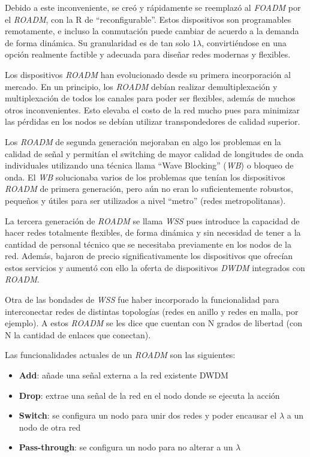Debido a este inconveniente, se creó y rápidamente se reemplazó al
\emph{FOADM} por el \emph{ROADM}, con la R de
``reconfigurable''. Estos dispositivos son programables remotamente, e
incluso la conmutación puede cambiar de acuerdo a la demanda de forma
dinámica. Su granularidad es de tan solo $1\lambda$, convirtiéndose en
una opción realmente factible y adecuada para diseñar redes modernas y
flexibles.

Los dispositivos \emph{ROADM} han evolucionado desde su primera
incorporación al mercado. En un principio, los \emph{ROADM} debían
realizar demultiplexación y multiplexación de todos los canales para
poder ser flexibles, además de muchos otros inconvenientes. Esto
elevaba el costo de la red mucho pues para minimizar las pérdidas en
los nodos se debían utilizar transpondedores de calidad superior.

Los \emph{ROADM} de segunda generación mejoraban en algo los problemas
en la calidad de señal y permitían el switching de mayor calidad de
longitudes de onda individuales utilizando una técnica llama ``Wave
Blocking'' (\emph{WB}) o bloqueo de onda. El \emph{WB} solucionaba
varios de los problemas que tenían los dispositivos \emph{ROADM} de
primera generación, pero aún no eran lo suficientemente robustos,
pequeños y útiles para ser utilizados a nivel ``metro'' (redes
metropolitanas).

La tercera generación de \emph{ROADM} se llama \emph{WSS} pues
introduce la capacidad de hacer redes totalmente flexibles, de forma
dinámica y sin necesidad de tener a la cantidad de personal técnico
que se necesitaba previamente en los nodos de la red. Además, bajaron
de precio significativamente los dispositivos que ofrecían estos
servicios y aumentó con ello la oferta de dispositivos \emph{DWDM}
integrados con \emph{ROADM}.

Otra de las bondades de \emph{WSS} fue haber incorporado la
funcionalidad para interconectar redes de distintas topologías (redes
en anillo y redes en malla, por ejemplo). A estos \emph{ROADM} se les
dice que cuentan con N grados de libertad (con N la cantidad de
enlaces que conectan).


Las funcionalidades actuales de un \emph{ROADM} son las siguientes:
\begin{itemize}
\item \textbf{Add}: añade una señal externa a la red existente DWDM
\item \textbf{Drop}: extrae una señal de la red en el nodo donde se ejecuta la
  acción
\item \textbf{Switch}: se configura un nodo para unir dos redes y poder
  encausar el $\lambda$ a un nodo de otra red
\item \textbf{Pass-through}: se configura un nodo para no alterar a un
  $\lambda$
\end{itemize}

